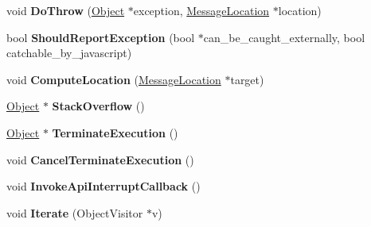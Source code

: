 \begin{DoxyCompactItemize}
\item 
\hypertarget{classv8_1_1internal_1_1_isolate_ad90bb8caa879f1118e9ab4bed52552d8}{}void {\bfseries Do\+Throw} (\hyperlink{classv8_1_1internal_1_1_object}{Object} $\ast$exception, \hyperlink{classv8_1_1internal_1_1_message_location}{Message\+Location} $\ast$location)\label{classv8_1_1internal_1_1_isolate_ad90bb8caa879f1118e9ab4bed52552d8}

\item 
\hypertarget{classv8_1_1internal_1_1_isolate_a1671c6a40e602595bfe07acbac2604af}{}bool {\bfseries Should\+Report\+Exception} (bool $\ast$can\+\_\+be\+\_\+caught\+\_\+externally, bool catchable\+\_\+by\+\_\+javascript)\label{classv8_1_1internal_1_1_isolate_a1671c6a40e602595bfe07acbac2604af}

\item 
\hypertarget{classv8_1_1internal_1_1_isolate_adca39004b165354b6352d96cd915c01c}{}void {\bfseries Compute\+Location} (\hyperlink{classv8_1_1internal_1_1_message_location}{Message\+Location} $\ast$target)\label{classv8_1_1internal_1_1_isolate_adca39004b165354b6352d96cd915c01c}

\item 
\hypertarget{classv8_1_1internal_1_1_isolate_aed0b4300eaf251291dadf3c93a8e507f}{}\hyperlink{classv8_1_1internal_1_1_object}{Object} $\ast$ {\bfseries Stack\+Overflow} ()\label{classv8_1_1internal_1_1_isolate_aed0b4300eaf251291dadf3c93a8e507f}

\item 
\hypertarget{classv8_1_1internal_1_1_isolate_a2e2c918ec2e8fa0efa312cff1306057a}{}\hyperlink{classv8_1_1internal_1_1_object}{Object} $\ast$ {\bfseries Terminate\+Execution} ()\label{classv8_1_1internal_1_1_isolate_a2e2c918ec2e8fa0efa312cff1306057a}

\item 
\hypertarget{classv8_1_1internal_1_1_isolate_a5cb7af73c1baa2d1036c632bf48c1a6a}{}void {\bfseries Cancel\+Terminate\+Execution} ()\label{classv8_1_1internal_1_1_isolate_a5cb7af73c1baa2d1036c632bf48c1a6a}

\item 
\hypertarget{classv8_1_1internal_1_1_isolate_af4522b767b8f01b66588f79e0ba76014}{}void {\bfseries Invoke\+Api\+Interrupt\+Callback} ()\label{classv8_1_1internal_1_1_isolate_af4522b767b8f01b66588f79e0ba76014}

\item 
\hypertarget{classv8_1_1internal_1_1_isolate_a858eb3b0ac0ee5d221bd6b0b72d0a4fd}{}void {\bfseries Iterate} (Object\+Visitor $\ast$v)\label{classv8_1_1internal_1_1_isolate_a858eb3b0ac0ee5d221bd6b0b72d0a4fd}


\end{DoxyCompactItemize}
